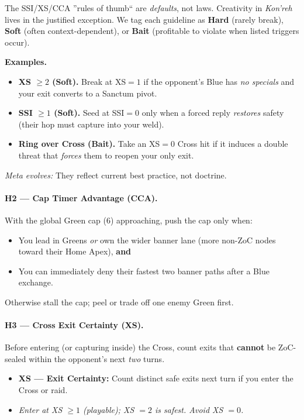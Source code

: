\documentclass[11pt]{article}
\begin{document}
\begin{tcolorbox}[enhanced,breakable,title={Designer Note --- Heuristics Are Handles, Not Handcuffs},
  colback=white,colframe=royal,boxrule=0.8pt]
\small
The SSI/XS/CCA ''rules of thumb`` are \emph{defaults}, not laws. Creativity in \textit{Kon'reh} lives in the justified exception.
We tag each guideline as \textbf{Hard} (rarely break), \textbf{Soft} (often context-dependent), or \textbf{Bait} (profitable to violate when listed triggers occur).

\textbf{Examples.}
\begin{itemize}[leftmargin=1.2em,itemsep=0.2em]
  \item \textbf{XS $\ge 2$ (Soft).} Break at XS$=1$ if the opponent's Blue has \emph{no specials} and your exit converts to a Sanctum pivot.
  \item \textbf{SSI $\ge 1$ (Soft).} Seed at SSI$=0$ only when a forced reply \emph{restores} safety (their hop must capture into your weld).
  \item \textbf{Ring over Cross (Bait).} Take an XS$=0$ Cross hit if it induces a double threat that \emph{forces} them to reopen your only exit.
\end{itemize}
\emph{Meta evolves:} They reflect current best practice, not doctrine.
\end{tcolorbox}

\paragraph{H2 --- Cap Timer  Advantage (CCA).}
With the global Green cap (6) approaching, push the cap only when:
\begin{itemize}
  \item You lead in Greens \emph{or} own the wider banner lane (more non-ZoC nodes toward their Home Apex), \textbf{and}
  \item You can immediately deny their fastest two banner paths after a Blue exchange.
\end{itemize}
Otherwise stall the cap; peel or trade off one enemy Green first.

\paragraph{H3 --- Cross Exit Certainty (XS).}
Before entering (or capturing inside) the Cross, count exits that \textbf{cannot} be ZoC-sealed within the opponent's next \emph{two} turns.
\begin{itemize}
  \item \textbf{XS --- Exit Certainty:} Count distinct safe exits next turn if you enter the Cross or raid. 
  \item \emph{Enter at XS $\ge 1$ (playable); XS $=2$ is safest. Avoid XS $=0$.}
\end{itemize}
\end{document}
